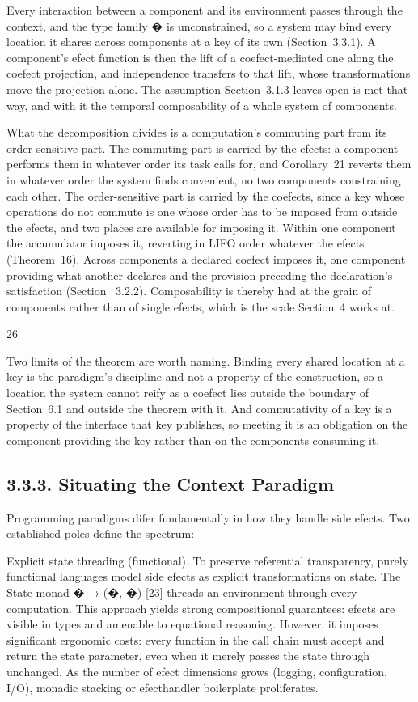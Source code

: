 \documentclass[
  10
]{article}
\begin{document}
Every interaction between a component and its environment passes through
the context, and the type family �︀ is unconstrained, so a system may
bind every location it shares across components at a key of its own
(Section~3.3.1). A component's efect function is then the lift of a
coefect-mediated one along the coefect projection, and independence
transfers to that lift, whose transformations move the projection alone.
The assumption Section~3.1.3 leaves open is met that way, and with it
the temporal composability of a whole system of components.

What the decomposition divides is a computation's commuting part from
its order-sensitive part. The commuting part is carried by the efects: a
component performs them in whatever order its task calls for, and
Corollary~21 reverts them in whatever order the system finds convenient,
no two components constraining each other. The order-sensitive part is
carried by the coefects, since a key whose operations do not commute is
one whose order has to be imposed from outside the efects, and two
places are available for imposing it. Within one component the
accumulator imposes it, reverting in LIFO order whatever the efects
(Theorem~16). Across components a declared coefect imposes it, one
component providing what another declares and the provision preceding
the declaration's satisfaction (Section~ 3.2.2). Composability is
thereby had at the grain of components rather than of single efects,
which is the scale Section~4 works at.

26

Two limits of the theorem are worth naming. Binding every shared
location at a key is the paradigm's discipline and not a property of the
construction, so a location the system cannot reify as a coefect lies
outside the boundary of Section~6.1 and outside the theorem with it. And
commutativity of a key is a property of the interface that key
publishes, so meeting it is an obligation on the component providing the
key rather than on the components consuming it.

\subsection{3.3.3. Situating the Context
Paradigm}\label{situating-the-context-paradigm}

Programming paradigms difer fundamentally in how they handle side
efects. Two established poles define the spectrum:

Explicit state threading (functional). To preserve referential
transparency, purely functional languages model side efects as explicit
transformations on state. The State monad � → (�, �) {[}23{]} threads an
environment through every computation. This approach yields strong
compositional guarantees: efects are visible in types and amenable to
equational reasoning. However, it imposes significant ergonomic costs:
every function in the call chain must accept and return the state
parameter, even when it merely passes the state through unchanged. As
the number of efect dimensions grows (logging, configuration, I/O),
monadic stacking or efecthandler boilerplate proliferates.
\end{document}

